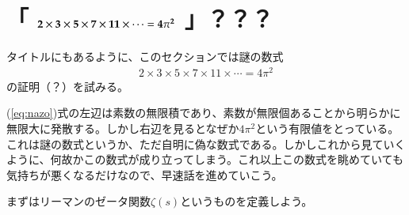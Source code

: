 \documentclass[11pt,b5paper,papersize,dvipdfmx]{jsbook}
\begin{document}

\section{「 $\bf 2\times 3\times 5\times 7\times 11\times\cdots = 4\pi^2$ 」？？？}
\label{sec:1}

タイトルにもあるように、このセクションでは謎の数式
\begin{align}
  2\times 3\times 5\times 7\times 11\times\cdots = 4\pi^2 \label{eq:nazo}
\end{align}
の証明（？）を試みる。\par
(\ref{eq:nazo})式の左辺は素数の無限積であり、素数が無限個あることから明らかに無限大に発散する。しかし右辺を見るとなぜか$4\pi^2$という有限値をとっている。これは謎の数式というか、ただ自明に偽な数式である。しかしこれから見ていくように、何故かこの数式が成り立ってしまう。これ以上この数式を眺めていても気持ちが悪くなるだけなので、早速話を進めていこう。\par
まずはリーマンのゼータ関数$\zeta(s)$というものを定義しよう。

%
\end{document}
